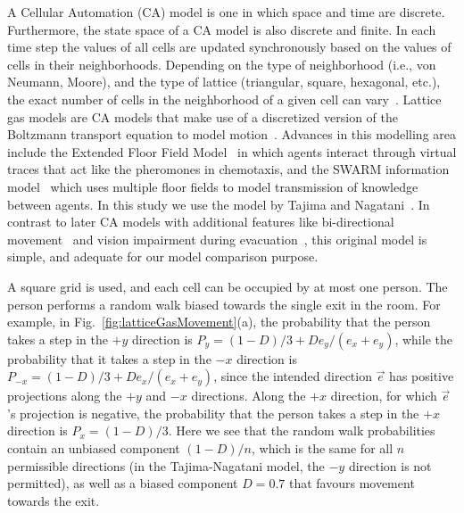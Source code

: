 A Cellular Automation (CA) model is one in which space and time are discrete. Furthermore, the state space of a CA model is also discrete and finite. In each time step the values of all cells are updated synchronously based on the values of cells in their neighborhoods. Depending on the type of neighborhood (i.e., von Neumann, Moore), and the type of lattice (triangular, square, hexagonal, etc.), the exact number of cells in the neighborhood of a given cell can vary~\cite{Hoekstra:2010}.
Lattice gas models are CA models that make use of a discretized version of the Boltzmann transport equation to model motion~\cite{Marconi:2002ue,Marconi2002,Nagai:2004kl}. Advances in this modelling area include the Extended Floor Field Model~\cite{nishinari2004extended} in which agents interact through virtual traces that act like the pheromones in chemotaxis, and the SWARM information model~\cite{Henein:2006jq} which uses multiple floor fields to model transmission of knowledge between agents.
In this study we use the model by Tajima and Nagatani~\cite{Tajima:2001to}. In contrast to later CA models with additional features like bi-directional movement~\cite{isobe2004experiment} and vision impairment during evacuation~\cite{Nagai:2004kl}, this original model is simple, and adequate for our model comparison purpose.

A square grid is used, and each cell
can be occupied by at most one person. The person performs a random walk biased towards the single exit in the room. For example, in Fig.~\ref{fig:latticeGasMovement}(a), the probability that the person takes a step in the $+y$ direction is $P_y = (1 - D)/3 + D e_y /(e_x + e_y)$, while the probability that it takes a step in the $-x$ direction is $P_{-x} = (1 - D)/3 + D e_x /(e_x + e_y)$, since the intended direction $\vec{e}$ has positive projections along the $+y$ and $-x$ directions. Along the $+x$ direction, for which $\vec{e}$'s projection is negative, the probability that the person takes a step in the $+x$ direction is $P_x = (1 - D)/3$. Here we see that the random walk probabilities contain an unbiased component $(1 - D)/n$, which is the same for all $n$ permissible directions (in the Tajima-Nagatani model, the $-y$ direction is not permitted), as well as a biased component $D = 0.7$ that favours movement towards the exit.

